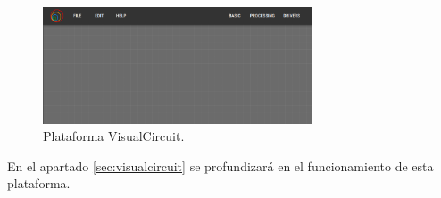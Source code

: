 \begin{figure} [H]
  \begin{center}
    \includegraphics[width=8cm]{figs/c1/empty_VC.png}
  \end{center}
  \caption[Plataforma VisualCircuit]{Plataforma VisualCircuit.}
  \label{fig:VC_plat}
\end{figure}

En el apartado \ref{sec:visualcircuit} se profundizará en el funcionamiento de esta plataforma.